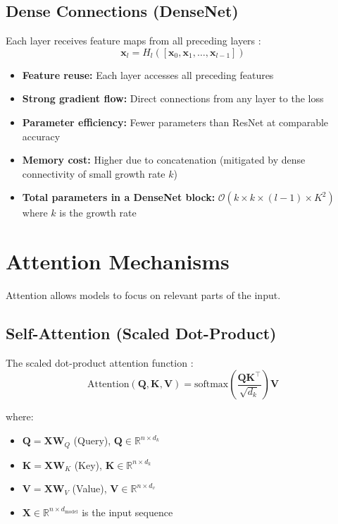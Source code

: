 \subsection{Dense Connections (DenseNet)}

Each layer receives feature maps from all preceding layers \cite{huang2017densely}:
\begin{equation}
\mathbf{x}_l = H_l([\mathbf{x}_0, \mathbf{x}_1, \ldots, \mathbf{x}_{l-1}])
\end{equation}

\begin{properties}
\begin{itemize}
    \item \textbf{Feature reuse:} Each layer accesses all preceding features
    \item \textbf{Strong gradient flow:} Direct connections from any layer to the loss
    \item \textbf{Parameter efficiency:} Fewer parameters than ResNet at comparable accuracy
    \item \textbf{Memory cost:} Higher due to concatenation (mitigated by dense connectivity of small growth rate $k$)
    \item \textbf{Total parameters in a DenseNet block:} $\mathcal{O}(k \times k \times (l-1) \times K^2)$ where $k$ is the growth rate
\end{itemize}
\end{properties}

\section{Attention Mechanisms}

Attention allows models to focus on relevant parts of the input.

\subsection{Self-Attention (Scaled Dot-Product)}

The scaled dot-product attention function \cite{vaswani2017attention}:
\begin{equation}
\text{Attention}(\mathbf{Q}, \mathbf{K}, \mathbf{V}) = \text{softmax}\left(\frac{\mathbf{Q}\mathbf{K}^\top}{\sqrt{d_k}}\right)\mathbf{V}
\end{equation}

where:
\begin{itemize}
    \item $\mathbf{Q} = \mathbf{X}\mathbf{W}_Q$ (Query), $\mathbf{Q} \in \mathbb{R}^{n \times d_k}$
    \item $\mathbf{K} = \mathbf{X}\mathbf{W}_K$ (Key), $\mathbf{K} \in \mathbb{R}^{n \times d_k}$
    \item $\mathbf{V} = \mathbf{X}\mathbf{W}_V$ (Value), $\mathbf{V} \in \mathbb{R}^{n \times d_v}$
    \item $\mathbf{X} \in \mathbb{R}^{n \times d_{\text{model}}}$ is the input sequence
\end{itemize}

